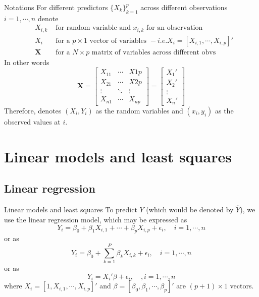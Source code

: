 \documentclass{beamer}
\begin{document}
\begin{frame}{Notations}
For different predictors $\{X_k\}_{k=1}^p$ across different observations $i=1,\cdots,n$ denote
\begin{eqnarray*}
 &X_{i,k}&\text{ for random variable and }x_{i,k}\text{ for an observation}\\
&X_i&\text{ for a $p\times 1$ vector of variables } - i.e. X_i=[X_{i,1},\cdots,X_{i,p}]'\\
&\bm{X}&\text{ for a $N\times p$ matrix of variables across different obvs}
\end{eqnarray*}
In other words
\[
\bm{X}=
\begin{bmatrix}
X_{11}&\cdots &X{1p}\\
X_{21}&\cdots &X{2p}\\
\vdots&\ddots&\vdots\\
X_{n1}&\cdots&X_{np}
\end{bmatrix}
=
\begin{bmatrix}
X_{1}'\\
X_{2}'\\
\vdots\\
X_{n}'
\end{bmatrix}
\]
Therefore, denotes $(X_i,Y_i)$ as the random variables and $(x_i,y_i)$ as the observed values at $i$.
\end{frame}
\section{Linear models and least squares}
\subsection{Linear regression}
\begin{frame}{Linear models and least squares}
To predict $Y$ (which would be denoted by $\hat{Y}$), we use the linear regression model, which may be expressed as
\begin{equation}\label{eq: LS1}
Y_i=\beta_0+\beta_1 X_{i,1}+\cdots+\beta_p X_{i,p}+\epsilon_i,\quad i=1,\cdots,n
\end{equation}
or as
\begin{equation}\label{eq: LS2}
Y_i=\beta_0+\sum\limits_{k=1}^P\beta_k X_{i,k}+\epsilon_i,\quad i=1,\cdots,n
\end{equation}
or as
\begin{equation}\label{eq: LS3}
Y_i=X_i'\beta+\epsilon_i,\quad,i=1,\cdots,n
\end{equation}
where $X_i=[1,X_{i,1},\cdots,X_{i,p}]'$ and $\beta=[\beta_0,\beta_1,\cdots,\beta_p]'$ are $(p+1)\times 1$ vectors.
\end{frame}
\end{document}
